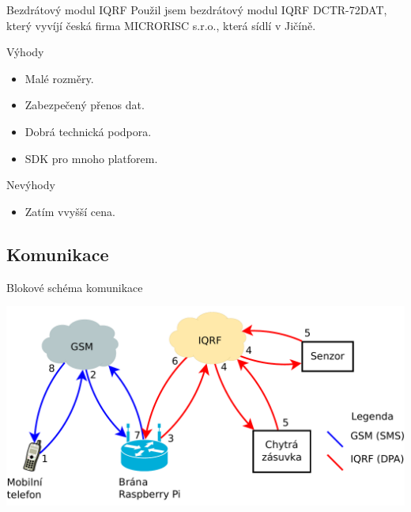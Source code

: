 \documentclass[11pt]{beamer}
\begin{document}
\begin{frame}{Bezdrátový modul IQRF}
  Použil jsem bezdrátový modul IQRF DCTR-72DAT, který vyvíjí česká firma MICRORISC s.r.o., která sídlí v Jičíně.
  \begin{exampleblock}{Výhody}
    \begin{itemize}
      \item Malé rozměry.
      \item Zabezpečený přenos dat.
      \item Dobrá technická podpora.
      \item SDK pro mnoho platforem.
    \end{itemize}
  \end{exampleblock}
  \begin{alertblock}{Nevýhody}
    \begin{itemize}
      \item Zatím vvyšší cena.
    \end{itemize}
  \end{alertblock}
\end{frame}

\subsection{Komunikace}

\begin{frame}{Blokové schéma komunikace}
  \begin{center}
    \includegraphics[width = \textwidth]{../img/blokove-schema/komunikace.pdf}
  \end{center}
\end{frame}


%
\end{document}
